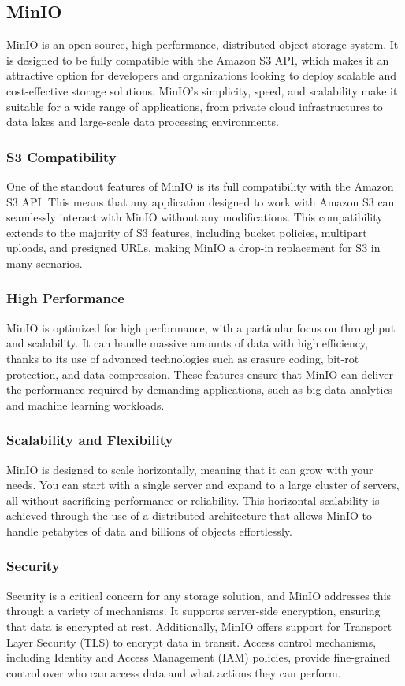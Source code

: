 \subsection{MinIO}
MinIO is an open-source, high-performance, distributed object storage system. It
is designed to be fully compatible with the Amazon S3 API, which makes it an
attractive option for developers and organizations looking to deploy scalable
and cost-effective storage solutions. MinIO's simplicity, speed, and scalability
make it suitable for a wide range of applications, from private cloud
infrastructures to data lakes and large-scale data processing environments.

\subsubsection{S3 Compatibility}
One of the standout features of MinIO is its full compatibility with the Amazon
S3 API. This means that any application designed to work with Amazon S3 can
seamlessly interact with MinIO without any modifications. This compatibility
extends to the majority of S3 features, including bucket policies, multipart
uploads, and presigned URLs, making MinIO a drop-in replacement for S3 in many
scenarios.

\subsubsection{High Performance}
MinIO is optimized for high performance, with a particular focus on throughput
and scalability. It can handle massive amounts of data with high efficiency,
thanks to its use of advanced technologies such as erasure coding, bit-rot
protection, and data compression. These features ensure that MinIO can deliver
the performance required by demanding applications, such as big data analytics
and machine learning workloads.

\subsubsection{Scalability and Flexibility}
MinIO is designed to scale horizontally, meaning that it can grow with your
needs. You can start with a single server and expand to a large cluster of
servers, all without sacrificing performance or reliability. This horizontal
scalability is achieved through the use of a distributed architecture that
allows MinIO to handle petabytes of data and billions of objects effortlessly.

\subsubsection{Security}
Security is a critical concern for any storage solution, and MinIO addresses
this through a variety of mechanisms. It supports server-side encryption,
ensuring that data is encrypted at rest. Additionally, MinIO offers support for
Transport Layer Security (TLS) to encrypt data in transit. Access control
mechanisms, including Identity and Access Management (IAM) policies, provide
fine-grained control over who can access data and what actions they can perform.


